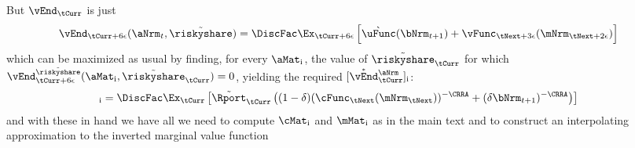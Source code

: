 \documentclass[./SolvingMicroDSOPs]{subfiles}
\begin{document}
{But $\vEnd_{\tCurr}$ is just 
\begin{align}
  \vEnd_{\tCurr+\definevEnd}(\aNrm_{t},\Rend{\riskyshare}) & = \DiscFac \Ex_{\tCurr+\definevEnd}\left[\uFromB(\bNrm_{t+1})+\vFunc_{\tNext+\choosecons}(\mNrm_{\tNext+\calculatem})\right]
\end{align}
which can be maximized as usual by finding, for every $\aMat_{\aIdx}$, the value of $\Rend{\riskyshare}_{\tCurr}$ for which $\vEnd_{\tCurr+\definevEnd}^{\Rend{\riskyshare}}(\aMat_{\aIdx},\Rend{\riskyshare}_{\tCurr}) = 0$, yielding  the required $[\Maxed{\vEnd}_{\tCurr}^{\aNrm}]_{\aIdx}$:
\begin{align}
  [\Maxed{\vEnd}_{\tCurr}^{\aNrm}]_{\aIdx} & = \DiscFac \Ex_{\tCurr}\left[\Rend{\Rport}_{\tCurr}\left((1-\wealthU)(\cFunc_{\tNext}(\mNrm_{\tNext}))^{-\CRRA}+(\wealthU \bNrm_{t+1})^{-\CRRA}\right)
                                        \right]
\end{align}
and with these in hand we have all we need to compute $\cMat_{\aIdx}$ and $\mMat_{\aIdx}$ as in the main text and to construct an interpolating approximation to the inverted marginal value function 

}{} %
\end{document}

